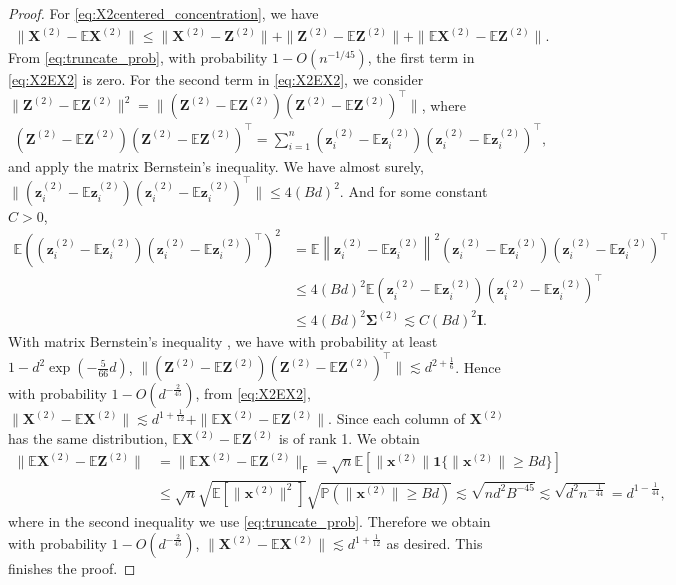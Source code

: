\documentclass[twoside,11pt]{article}
\newcommand{\norm}[1]{\left\|#1\right\|}
\newcommand{\E}{\mathbb{E}}
\def\bI{{\mathbf I}}
\def\bX{{\boldsymbol X}}
\def\bZ{{\boldsymbol Z}}
\def\bx{{\boldsymbol x}}
\def\bz{{\boldsymbol z}}
\def\bSigma{{\boldsymbol \Sigma}}
\newcommand{\1}{\mathbf{1}}
\def\msf{\mathsf}
\begin{document}
\begin{proof}
     
     For \eqref{eq:X2centered_concentration}, we have 
\begin{align}\label{eq:X2EX2}
    \|\bX^{(2)}-\E \bX^{(2)}\|\leq \|\bX^{(2)}-\bZ^{(2)}\|+\|\bZ^{(2)}-\E\bZ^{(2)}\|+\|\E\bX^{(2)}-\E\bZ^{(2)}\|.
\end{align}
From \eqref{eq:truncate_prob}, with probability $1-O(n^{-1/45})$, the first term in \eqref{eq:X2EX2} is zero. For the second term in \eqref{eq:X2EX2}, we consider $\|\bZ^{(2)}-\E\bZ^{(2)}\|^2=\|(\bZ^{(2)}-\E\bZ^{(2)})(\bZ^{(2)}-\E\bZ^{(2)})^\top \|$,   
where 
\begin{align}
  (\bZ^{(2)}-\E\bZ^{(2)})(\bZ^{(2)}-\E\bZ^{(2)})^\top= \sum_{i=1}^n (\bz_i^{(2)}-\E  \bz_i^{(2)})(\bz_i^{(2)}-\E  \bz_i^{(2)})^\top,
\end{align}
and apply the matrix Bernstein's inequality.
We have almost surely, $\| (\bz_i^{(2)}-\E  \bz_i^{(2)})(\bz_i^{(2)}-\E  \bz_i^{(2)})^\top\| \leq 4(Bd)^2$.
And for some constant $C>0$,
\begin{align}
    \E \left((\bz_i^{(2)}-\E  \bz_i^{(2)})(\bz_i^{(2)}-\E  \bz_i^{(2)})^\top\right)^2&=\E \norm{\bz_i^{(2)}-\E  \bz_i^{(2)}}^2(\bz_i^{(2)}-\E  \bz_i^{(2)})(\bz_i^{(2)}-\E  \bz_i^{(2)})^\top \\
    &\leq 4(Bd)^2 \E (\bz_i^{(2)}-\E  \bz_i^{(2)})(\bz_i^{(2)}-\E  \bz_i^{(2)})^\top\\
    &\leq 4(Bd)^2 \bSigma^{(2)}\lesssim C(Bd)^2\bI.
\end{align}
With matrix Bernstein's inequality \citep[Theorem 5.4.1]{vershynin2018high}, we have with probability at least $1-d^2 \exp(-\frac{5}{66}d)$,
$\|(\bZ^{(2)}-\E\bZ^{(2)})(\bZ^{(2)}-\E\bZ^{(2)})^\top\|\lesssim d^{2+\frac{1}{6}}$.
Hence with probability $1-O(d^{-\frac{2}{45}})$, from \eqref{eq:X2EX2},
$
 \|\bX^{(2)}-\E \bX^{(2)}\| \lesssim d^{1+\frac{1}{12}} + \|\E\bX^{(2)}-\E\bZ^{(2)}\|$.  Since each column of $\bX^{(2)}$ has the same distribution,    $\E\bX^{(2)}-\E\bZ^{(2)}$ is of rank 1. We obtain 
  \begin{align}
   \|\E\bX^{(2)}-\E\bZ^{(2)}\|&=\|\E\bX^{(2)}-\E\bZ^{(2)}\|_{\msf F}= \sqrt{n} \mathbb E[\|\bx^{(2)}\|\mathbf{1}\{\|\bx^{(2)}\|\geq Bd \}] \\
   &\leq \sqrt{n} \sqrt{\E[\|\bx^{(2)}\|^2]}\sqrt{\mathbb P(\|\bx^{(2)}\|\geq Bd)}\lesssim \sqrt{nd^2B^{-45}}\lesssim \sqrt{d^2n^{-\frac{1}{44}}}=d^{1-\frac{1}{44}},
  \end{align}
  where in the second inequality we use \eqref{eq:truncate_prob}. Therefore we obtain with probability $1-O(d^{-\frac{2}{45}})$,
$\|\bX^{(2)}-\E \bX^{(2)}\| \lesssim d^{1+\frac{1}{12}}$ 
as desired. This finishes the proof.
\end{proof}
 
\end{document}

